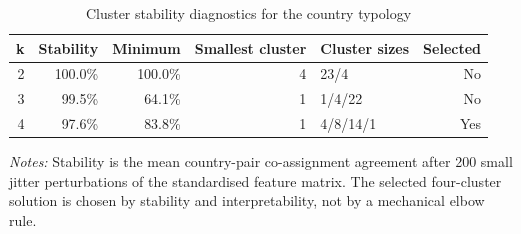 \begin{table}[H]
\centering
\footnotesize
\setlength{\tabcolsep}{3pt}
\caption{Cluster stability diagnostics for the country typology}
\label{tab:app_country_typology_cluster_stability}
\begin{tabular}{@{}rrrrlr@{}}
\toprule
k & Stability & Minimum & Smallest cluster & Cluster sizes & Selected \\
\midrule
2 & 100.0\% & 100.0\% & 4 & 23/4 & No \\
3 &  99.5\% &  64.1\% & 1 & 1/4/22 & No \\
4 &  97.6\% &  83.8\% & 1 & 4/8/14/1 & Yes \\
\bottomrule
\end{tabular}

\vspace{0.35em}
\noindent\begin{minipage}{\textwidth}
\footnotesize\raggedright\textit{Notes:} Stability is the mean country-pair co-assignment agreement after 200 small jitter perturbations of the standardised feature matrix. The selected four-cluster solution is chosen by stability and interpretability, not by a mechanical elbow rule.
\end{minipage}
\end{table}
